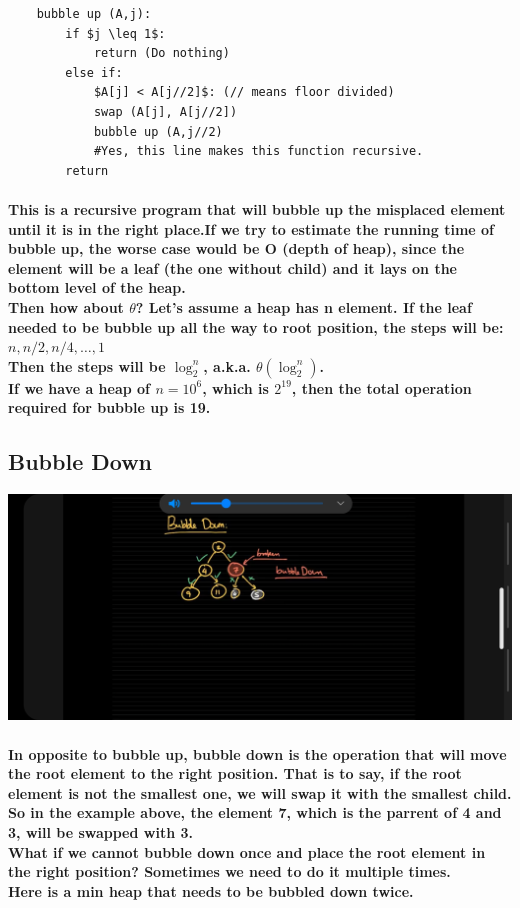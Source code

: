 \documentclass{article}
\begin{document}
\begin{verbatim}
    bubble up (A,j):
        if $j \leq 1$:
            return (Do nothing)
        else if:
            $A[j] < A[j//2]$: (// means floor divided)
            swap (A[j], A[j//2])
            bubble up (A,j//2) 
            #Yes, this line makes this function recursive.
        return
    \end{verbatim}

\paragraph{This is a recursive program that will bubble up the misplaced element until it is in the right place.If we try to estimate the running time of bubble up, the worse case would be O (depth of heap), since the element will be a leaf (the one without child) and it lays on the bottom level of the heap.\\
Then how about $\theta$? Let's assume a heap has n element. If the leaf needed to be bubble up all the way to root position, the steps will be:\\
$n,n/2,n/4, \ldots ,1$\\
Then the steps will be $\log_2^n$, a.k.a. $\theta(\log_2^n)$.\\
If we have a heap of $n = 10^6$, which is $2^{19}$, then the total operation required for bubble up is 19.}

\subsection{Bubble Down}


\includegraphics[width=\textwidth]{bubbledown}



\paragraph{In opposite to bubble up, bubble down is the operation that will move the root element to the right position.
That is to say, if the root element is not the smallest one, we will swap it with the smallest child.
So in the example above, the element 7, which is the parrent of 4 and 3, will be swapped with 3.\\
What if we cannot bubble down once and place the root element in the right position? Sometimes we need to do it multiple times.\\
Here is a min heap that needs to be bubbled down twice.\\}
\end{document}
